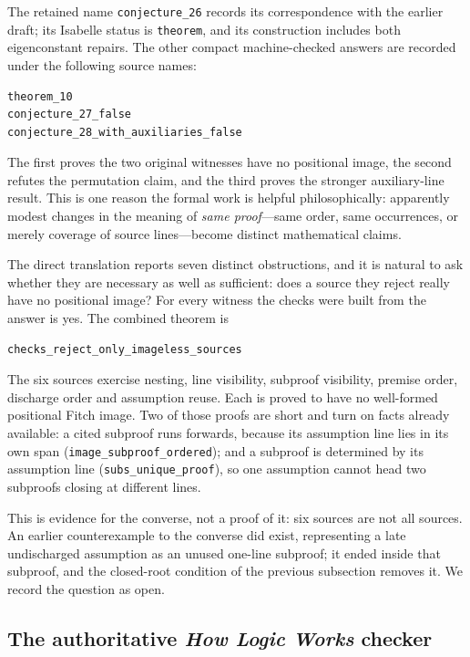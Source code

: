 \documentclass[11pt]{article}
\theoremstyle{plain}
\theoremstyle{definition}
\theoremstyle{remark}
\begin{document}
\noindent The retained name \verb|conjecture_26| records its correspondence
with the earlier draft; its Isabelle status is \verb|theorem|, and its
construction includes both eigenconstant repairs. The other compact
machine-checked answers are recorded under the following source names:

\begin{lstlisting}[language={}]
theorem_10
conjecture_27_false
conjecture_28_with_auxiliaries_false
\end{lstlisting}

\noindent The first proves the two original witnesses have no positional
image, the second refutes the permutation claim, and the third proves the
stronger auxiliary-line result. This is one reason the formal work is helpful
philosophically: apparently modest changes in the meaning of \emph{same
proof}---same order, same occurrences, or merely coverage of source
lines---become distinct mathematical claims.

The direct translation reports seven distinct obstructions, and it is natural
to ask whether they are necessary as well as sufficient: does a source they
reject really have no positional image? For every witness the checks were
built from the answer is yes. The combined theorem is
\begin{lstlisting}[language={}]
checks_reject_only_imageless_sources
\end{lstlisting}
\noindent The six sources exercise nesting, line visibility, subproof
visibility, premise order, discharge order and assumption reuse. Each is
proved to have no well-formed positional Fitch image.
Two of those proofs are short and turn on facts already available: a cited
subproof runs forwards, because its assumption line lies in its own span
(\verb|image_subproof_ordered|); and a subproof is determined by its
assumption line (\verb|subs_unique_proof|), so one assumption cannot head two
subproofs closing at different lines.

This is evidence for the converse, not a proof of it: six sources are not all
sources. An earlier counterexample to the converse did exist, representing a
late undischarged assumption as an unused one-line subproof; it ended inside
that subproof, and the closed-root condition of the previous subsection
removes it. We record the question as open.

\subsection{The authoritative \emph{How Logic Works} checker}
\end{document}
